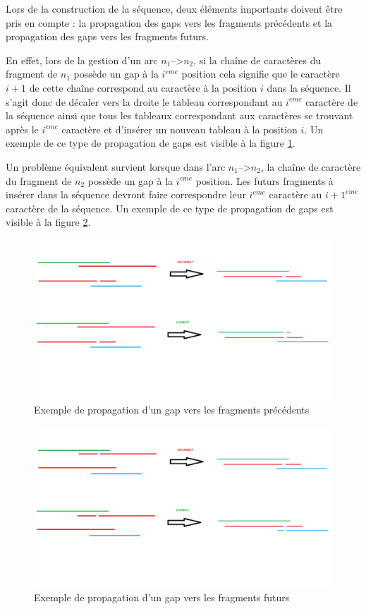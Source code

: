 \documentclass[12pt,a4paper,final]{article}
\begin{document}
Lors de la construction de la séquence, deux éléments importants doivent être pris en compte : la propagation des gaps vers les fragments précédents et la propagation des gaps vers les fragments futurs.\medskip

En effet, lors de la gestion d'un arc $n_1$-->$n_2$, si la chaîne de caractères du fragment de $n_1$ possède un gap à la $i^{eme}$ position cela signifie que le caractère $i+1$ de cette chaîne correspond au caractère à la position $i$ dans la séquence.  Il s'agit donc de décaler vers la droite le tableau correspondant au $i^{eme}$ caractère de la séquence ainsi que tous les tableaux correspondant aux caractères se trouvant après le $i^{eme}$ caractère et d'insérer un nouveau tableau à la position $i$.  Un exemple de ce type de propagation de gaps est visible à la figure \ref{gapPrecedent}.\medskip

Un problème équivalent survient lorsque dans l'arc $n_1$-->$n_2$, la chaîne de caractère du fragment de $n_2$ possède un gap à la $i^{eme}$ position.  Les futurs fragments à insérer dans la séquence devront faire correspondre leur $i^{eme}$ caractère au $i+1^{eme}$ caractère de la séquence.  Un exemple de ce type de propagation de gaps est visible à la figure \ref{gapSuivant}.\medskip

\begin{figure}
\centering
	\includegraphics[scale =0.4]{images/gapPrecedent.png}
	\caption{\label{gapPrecedent}Exemple de propagation d'un gap vers les fragments précédents}
\end{figure}

\begin{figure}
\centering
	\includegraphics[scale =0.4]{images/gapSuivant.png}
	\caption{\label{gapSuivant}Exemple de propagation d'un gap vers les fragments futurs}
\end{figure}



\end{document}
